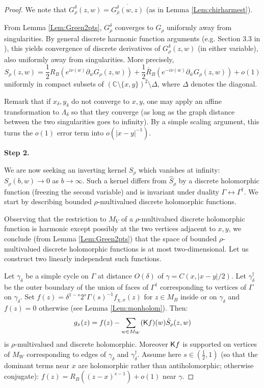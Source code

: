 \documentclass[10pt]{article}
\newcommand{\C}{\mathbb{C}}
\newcommand{\rK}{{\sf K}}
\newcommand{\dg}{\dagger}
\begin{document}
\begin{proof}
We note that $G^\delta_\rho(z,w)=\overline{G^\delta_{\bar\rho}(w,z)}$ (as in Lemma \ref{Lem:chirharmest}). 

From Lemma \ref{Lem:Green2pts}, $G^\delta_\rho$ converges to $G_\rho$ uniformly away from singularities. By general discrete harmonic function arguments (e.g. Section 3.3 in \cite{SmiChe_isoradial}), this yields convergence of discrete derivatives of $G^\delta_\rho(z,w)$ (in either variable), also uniformly away from singularities. More precisely,
$$S_\rho(z,w)=\frac 12R_B\left(e^{i\nu(w)}\partial_wG_\rho(z,w)\right)
+\frac 12\bar R_B\left(e^{-i\nu(w)}\partial_{\bar w}G_\rho(z,w)\right)+o(1)$$
uniformly in compact subsets of $(\C\setminus\{x,y\})^2\setminus\Delta$, where $\Delta$ denotes the diagonal. 

Remark that if $x_\delta,y_\delta$ do not converge to $x,y$, one may apply an affine transformation to $\Lambda_\delta$ so that they converge (as long as the graph distance between the two singularities goes to infinity). By a simple scaling argument, this turns the $o(1)$ error term into $o(|x-y|^{-1})$.


{\bf Step 2.}

We are now seeking an inverting kernel $S_\rho$ which vanishes at infinity: $S_\rho(b,w)\rightarrow 0$ as $b\rightarrow\infty$. Such a kernel differs from $\hat S_\rho$ by a discrete holomorphic function (freezing the second variable) and is invariant under duality $\Gamma\leftrightarrow\Gamma^\dg$. We start by describing bounded $\rho$-multivalued discrete holomorphic functions.

Observing that the restriction to $M_V$ of a $\rho$-multivalued discrete holomorphic function is harmonic except possibly at the two vertices adjacent to $x,y$, we conclude (from Lemma \ref{Lem:Green2pts}) that the space of bounded $\rho$-multivalued discrete holomorphic functions is at most two-dimensional. Let us construct two linearly independent such functions.

Let $\gamma_\delta$ be a simple cycle on $\Gamma$ at distance $O(\delta)$ of $\gamma=C(x,|x-y|/2)$. Let $\gamma_\delta^\dg$ be the outer boundary of the union of faces of $\Gamma^\dg$ corresponding to vertices of $\Gamma$ on $\gamma_\delta$. Set $f(z)=\delta^{1-s}2^s\Gamma(s)^{-1}f_{\chi,x}(z)$ for $z\in M_B$ inside or on $\gamma_\delta$ and $f(z)=0$ otherwise (see Lemma \ref{Lem:monholom}). Then:
$$g_x(z)=f(z)-\sum_{w\in M_W}(\rK f)(w)\hat S_\rho(z,w)$$
is $\rho$-multivalued and discrete holomorphic. Moreover $\rK f$ is supported on vertices of $M_W$ corresponding to edges of $\gamma_\delta$ and $\gamma_\delta^\dg$. Assume here $s\in (\frac 12,1)$ (so that the dominant terms near $x$ are holomorphic rather than antiholomorphic; otherwise conjugate): $f(z)=R_B((z-x)^{s-1})+o(1)$ near $\gamma$.


\end{proof}
\end{document}
